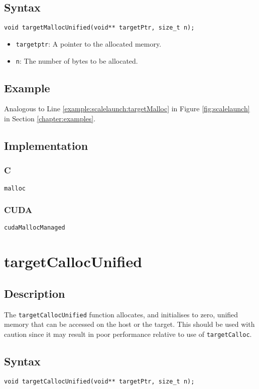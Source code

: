 \subsection{Syntax}
\begin{verbatim}
void targetMallocUnified(void** targetPtr, size_t n);
\end{verbatim}

\begin{itemize}
\item \verb+targetptr+: A pointer to the allocated memory.
\item \verb+n+: The number of bytes to be allocated.
\end{itemize}


\subsection{Example}
Analogous to Line \ref{example:scalelaunch:targetMalloc} in Figure \ref{fig:scalelaunch} in Section \ref{chapter:examples}.
\subsection{Implementation}
\subsubsection{C}
\verb+malloc+
\subsubsection{CUDA}
\verb+cudaMallocManaged+

\newpage
\section{targetCallocUnified}

\subsection{Description}


The \verb+targetCallocUnified+ function allocates, and initialises to zero, unified memory that can be accessed on the host or the target. This should be used with caution since it may result in poor performance relative to use of \verb+targetCalloc+.

\subsection{Syntax}
\begin{verbatim}
void targetCallocUnified(void** targetPtr, size_t n);
\end{verbatim}

